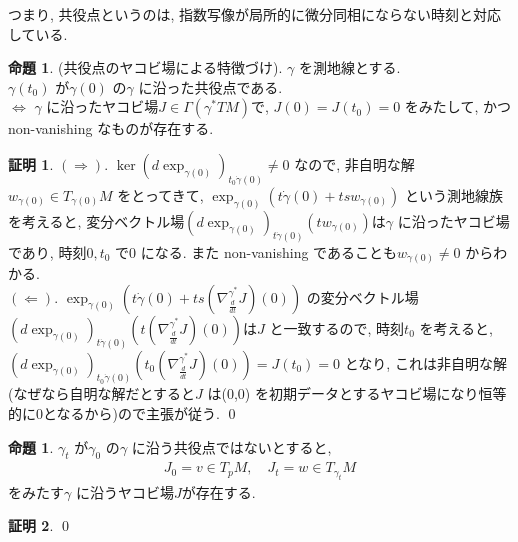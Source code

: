 \documentclass[twocolumn, landscape, a4paper , 8pt, fleqn, titlepage ]{jsarticle}
\theoremstyle{definition}
\newtheorem{prop}[dfn]{命題}
\newtheorem*{pf*}{証明}
\newcommand{\LR}{\Leftrightarrow}
\newcommand{\naraba}{\Rightarrow}
\newcommand{\gyaku}{\Leftarrow}
\renewcommand{\-}{\hyphen}
\begin{document}
つまり, 共役点というのは, 指数写像が局所的に微分同相にならない時刻と対応している. \\

\begin{prop}(共役点のヤコビ場による特徴づけ).
$\gamma$ を測地線とする. \\
$\gamma(t_0)$ が$\gamma(0)$ の$\gamma$ に沿った共役点である. \\
$\LR$ $\gamma$ に沿ったヤコビ場$J \in \Gamma(\gamma ^* TM)$で, $J(0) = J(t_0) = 0$ をみたして, かつ non-vanishing なものが存在する. 
\end{prop}
\begin{pf*}
$(\naraba)$. $\ker (d \exp _{\gamma(0)})_{t_0 \dot \gamma(0)} \neq 0$ なので, 非自明な解$w_{\gamma(0)} \in T_{\gamma(0)} M$ をとってきて, $\exp_{\gamma(0)} (t \dot \gamma(0) + ts w _{\gamma (0)})$ という測地線族を考えると, 変分ベクトル場$(d\exp_{\gamma(0)})_{t\dot \gamma(0)} (t w _{\gamma(0)})$は$\gamma $ に沿ったヤコビ場であり, 時刻$0, t_0$ で$0$ になる. また non-vanishing であることも$w_{\dot \gamma(0)} \neq 0$ からわかる. \\
$(\gyaku)$. $\exp_{\gamma(0)} (t \dot \gamma(0) + t s (\nabla ^{\gamma ^* } _{\frac{d}{dt} } J) (0) ) $ の変分ベクトル場$(d\exp_{\gamma(0)})_{t\dot \gamma(0)} (t (\nabla ^{\gamma ^* } _{\frac{d}{dt} } J) (0)  )$は$J$ と一致するので, 時刻$t_0$ を考えると,  $(d\exp_{\gamma(0)})_{t_0 \dot \gamma(0)} (t_0 (\nabla ^{\gamma ^* } _{\frac{d}{dt} } J) (0)  ) = J(t_0) = 0$ となり, これは非自明な解(なぜなら自明な解だとすると$J$ は(0,0) を初期データとするヤコビ場になり恒等的に0となるから)ので主張が従う.
\qed
\end{pf*}

\begin{prop}
$\gamma_t$ が$\gamma_0$ の$\gamma$ に沿う共役点ではないとすると, 
\begin{align*} J_0 = v \in T_pM, \quad J_t = w \in T_{\gamma_t} M \end{align*}
をみたす$\gamma$ に沿うヤコビ場$J$が存在する. 
\end{prop}
\begin{pf*}

\qed
\end{pf*}
\end{document}
